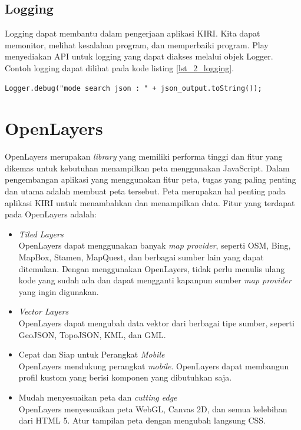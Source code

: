 \subsection{Logging}
Logging dapat membantu dalam pengerjaan aplikasi KIRI. Kita dapat memonitor, melihat kesalahan program, dan memperbaiki program. Play menyediakan API untuk logging yang dapat diakses melalui objek Logger. Contoh logging dapat dilihat pada kode listing \ref{lst_2_logging}.

\begin{lstlisting}[caption=Contoh logging menggunakan objek Logger,label = {lst_2_logging}]
	 Logger.debug("mode search json : " + json_output.toString());
\end{lstlisting} 

\section{OpenLayers}
\label{sec:openlayers}
OpenLayers \cite{openlayersbook} merupakan \textit{library} yang memiliki performa tinggi dan fitur yang dikemas untuk kebutuhan menampilkan peta menggunakan JavaScript. Dalam pengembangan aplikasi yang menggunakan fitur peta, tugas yang paling penting dan utama adalah membuat peta tersebut. Peta merupakan hal penting pada aplikasi KIRI untuk menambahkan dan menampilkan data. Fitur yang terdapat pada OpenLayers adalah:

\begin{itemize}
\item \textit{Tiled Layers}\\
			OpenLayers dapat menggunakan banyak \textit{map provider}, seperti OSM, Bing, MapBox, Stamen, MapQuest, dan berbagai sumber lain yang dapat ditemukan. Dengan menggunakan OpenLayers, tidak perlu menulis ulang kode yang sudah ada dan dapat mengganti kapanpun sumber \textit{map provider} yang ingin digunakan.
	\item \textit{Vector Layers}\\
			OpenLayers dapat mengubah data vektor dari berbagai tipe sumber, seperti GeoJSON, TopoJSON, KML, dan GML.
	\item Cepat dan Siap untuk Perangkat \textit{Mobile}\\
			OpenLayers mendukung perangkat \textit{mobile}. OpenLayers dapat membangun profil kustom yang berisi komponen yang dibutuhkan saja.
	\item Mudah menyesuaikan peta dan \textit{cutting edge}\\
			OpenLayers menyesuaikan peta WebGL, Canvas 2D, dan semua kelebihan dari HTML 5. Atur tampilan peta dengan mengubah langsung CSS.
\end{itemize}

